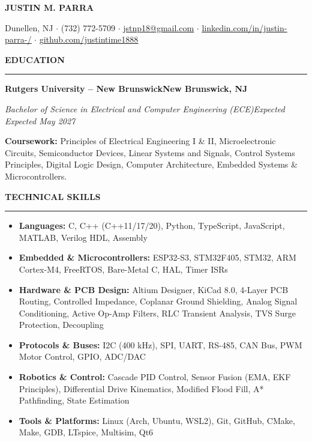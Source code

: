 \documentclass[10pt]{article}
\newcommand{\Section}[1]{%
  \vspace{4.0pt}%
  \textbf{\MakeUppercase{#1}}\par\vspace{-3.5pt}%
  \rule{\linewidth}{0.55pt}\par\vspace{2.5pt}%
}
\newcommand{\Company}[2]{\noindent\textbf{#1}\hfill\textbf{#2}\par}
\newcommand{\RoleDates}[2]{\noindent\textit{#1}\hfill\textit{#2}\par}
\begin{document}
\begin{center}
  {\LARGE \textbf{JUSTIN M. PARRA}}\par\vspace{2.0pt}
  \small Dunellen, NJ $\cdot$ (732) 772-5709 $\cdot$ \href{mailto:jstnp18@gmail.com}{\underline{jstnp18@gmail.com}} $\cdot$ \href{https://linkedin.com/in/justin-parra-/}{\underline{linkedin.com/in/justin-parra-/}} $\cdot$ \href{https://github.com/justintime1888}{\underline{github.com/justintime1888}}
\end{center}
\vspace{-6pt}

\Section{Education}
\Company{Rutgers University -- New Brunswick}{New Brunswick, NJ}
\RoleDates{Bachelor of Science in Electrical and Computer Engineering (ECE)}{Expected Expected May 2027}
\vspace{1pt}
\noindent\small{\textbf{Coursework:} Principles of Electrical Engineering I \& II, Microelectronic Circuits, Semiconductor Devices, Linear Systems and Signals, Control Systems Principles, Digital Logic Design, Computer Architecture, Embedded Systems \& Microcontrollers.}
\vspace{2pt}

\Section{Technical Skills}
\begin{itemize}
  \item \textbf{Languages:} C, C++ (C++11/17/20), Python, TypeScript, JavaScript, MATLAB, Verilog HDL, Assembly
  \item \textbf{Embedded \& Microcontrollers:} ESP32-S3, STM32F405, STM32, ARM Cortex-M4, FreeRTOS, Bare-Metal C, HAL, Timer ISRs
  \item \textbf{Hardware \& PCB Design:} Altium Designer, KiCad 8.0, 4-Layer PCB Routing, Controlled Impedance, Coplanar Ground Shielding, Analog Signal Conditioning, Active Op-Amp Filters, RLC Transient Analysis, TVS Surge Protection, Decoupling
  \item \textbf{Protocols \& Buses:} I2C (400 kHz), SPI, UART, RS-485, CAN Bus, PWM Motor Control, GPIO, ADC/DAC
  \item \textbf{Robotics \& Control:} Cascade PID Control, Sensor Fusion (EMA, EKF Principles), Differential Drive Kinematics, Modified Flood Fill, A* Pathfinding, State Estimation
  \item \textbf{Tools \& Platforms:} Linux (Arch, Ubuntu, WSL2), Git, GitHub, CMake, Make, GDB, LTspice, Multisim, Qt6
\end{itemize}
\vspace{2pt}
\end{document}
